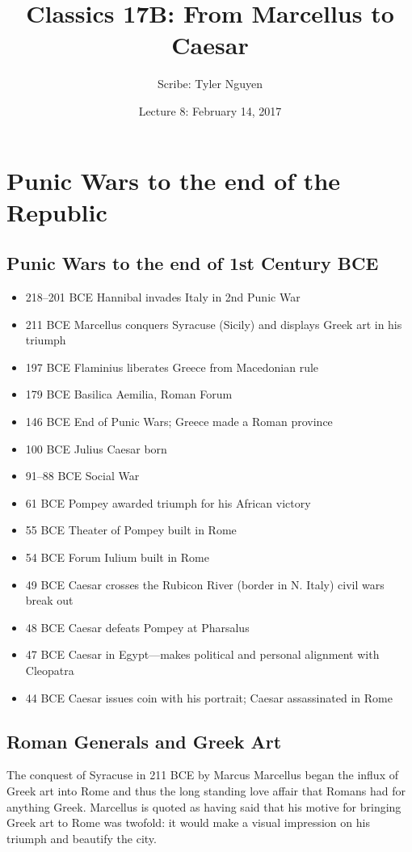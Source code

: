 \documentclass{article}
\begin{document}
\title{Classics 17B: From Marcellus to Caesar}
\author{Scribe: Tyler Nguyen}
\date{Lecture 8: February 14, 2017}
\maketitle
\section{Punic Wars to the end of the Republic}
\subsection{Punic Wars to the end of 1st Century BCE}
\begin{itemize}
\item 218--201 BCE Hannibal invades Italy in 2nd Punic War
\item 211 BCE Marcellus conquers Syracuse (Sicily) and displays Greek art in his triumph
\item 197 BCE Flaminius liberates Greece from Macedonian rule
\item 179 BCE Basilica Aemilia, Roman Forum
\item 146 BCE End of Punic Wars; Greece made a Roman province
\item 100 BCE Julius Caesar born
\item 91--88 BCE Social War
\item 61 BCE Pompey awarded triumph for his African victory
\item 55 BCE Theater of Pompey built in Rome
\item 54 BCE Forum Iulium built in Rome
\item 49 BCE Caesar crosses the Rubicon River (border in N. Italy) civil wars break out
\item 48 BCE Caesar defeats Pompey at Pharsalus
\item 47 BCE Caesar in Egypt---makes political and personal alignment with Cleopatra
\item 44 BCE Caesar issues coin with his portrait; Caesar assassinated in Rome
\end{itemize}
\subsection{Roman Generals and Greek Art}
The conquest of Syracuse in 211 BCE by Marcus Marcellus began the influx of Greek art into Rome and thus the long standing love affair that Romans had for anything Greek.  Marcellus is quoted as having said that his motive for bringing Greek art to Rome was twofold: it would make a visual impression on his triumph and beautify the city.
\end{document}
